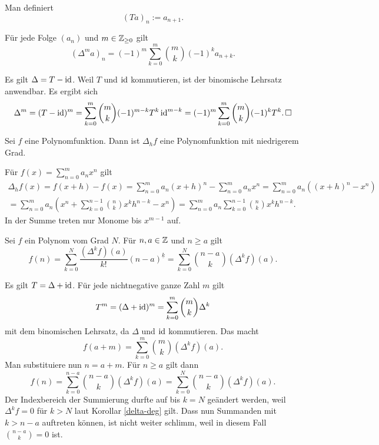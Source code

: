 \begin{Definition}[Shiftoperator] Man definiert
\[(Ta)_n := a_{n+1}.\]
\end{Definition}

\begin{Korollar}\newlinefirst
Für jede Folge $(a_n)$ und $m\in\mathbb Z_{\ge 0}$ gilt
\[(\Delta^m a)_n = (-1)^m\sum_{k=0}^m\binom{m}{k} (-1)^k a_{n+k}.\]
\end{Korollar}
\begin{Beweis} Es gilt $\Delta = T-\operatorname{id}$. Weil $T$ und $\operatorname{id}$ kommutieren,
ist der binomische Lehrsatz anwendbar. Es ergibt sich
\[\Delta^m = (T-\operatorname{id})^m = \sum_{k=0}^m\binom{m}{k} (-1)^{m-k} T^k\operatorname{id}^{m-k}
= (-1)^m \sum_{k=0}^m\binom{m}{k} (-1)^k T^k.\,\square\]
\end{Beweis}

\begin{Korollar}\label{delta-deg}
Sei $f$ eine Polynomfunktion. Dann ist $\Delta_h f$ eine
Polynomfunktion mit niedrigerem Grad.
\end{Korollar}
\begin{Beweis} Für $f(x)=\sum_{n=0}^m a_n x^n$ gilt
\begin{gather*}
\Delta_h f(x) = f(x+h) - f(x) = \sum_{n=0}^m a_n (x+h)^n - \sum_{n=0}^m a_n x^n
= \sum_{n=0}^m a_n ((x+h)^n - x^n)\\
= \sum_{n=0}^m a_n (x^n + \sum_{k=0}^{n-1}\binom{n}{k}x^k h^{n-k} - x^n)
= \sum_{n=0}^m a_n \sum_{k=0}^{n-1}\binom{n}{k}x^k h^{n-k}.
\end{gather*}
In der Summe treten nur Monome bis $x^{m-1}$ auf.\,\qedsymbol
\end{Beweis}

\begin{Satz} Sei $f$ ein Polynom vom Grad $N$. Für $n,a\in\mathbb Z$ und $n\ge a$ gilt
\[f(n) = \sum_{k=0}^N \frac{(\Delta^k f)(a)}{k!}(n-a)^{\underline k}
= \sum_{k=0}^N \binom{n-a}{k}(\Delta^k f)(a).\]
\end{Satz}
\begin{Beweis}
Es gilt $T=\Delta+\operatorname{id}$. Für jede nichtnegative ganze Zahl $m$ gilt
\[T^m = (\Delta+\operatorname{id})^m = \sum_{k=0}^m\binom{m}{k}\Delta^k\]
mit dem binomischen Lehrsatz, da $\Delta$ und $\operatorname{id}$ kommutieren. Das macht
\[f(a + m) = \sum_{k=0}^m\binom{m}{k}(\Delta^k f)(a).\]
Man substituiere nun $n = a+m$. Für $n\ge a$ gilt dann
\[f(n) = \sum_{k=0}^{n-a}\binom{n-a}{k}(\Delta^k f)(a)
= \sum_{k=0}^N\binom{n-a}{k}(\Delta^k f)(a).\]
Der Indexbereich der Summierung durfte auf bis $k=N$ geändert werden, weil
$\Delta^k f = 0$ für $k>N$ laut Korollar \ref{delta-deg} gilt. Dass nun
Summanden mit $k>n-a$ auftreten können, ist nicht weiter schlimm, weil
in diesem Fall $\binom{n-a}{k}=0$ ist.\,\qedsymbol
\end{Beweis}

